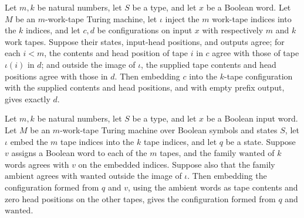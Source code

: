 \begin{lemma}
\label{Turing.MachineFormat.canonEmbedEq}
\leanok
{}
Let $m,k$ be natural numbers, let $S$ be a type, and let $x$ be a Boolean word. Let $M$
be an $m$-work-tape Turing machine, let $\iota$ inject the $m$ work-tape indices into
the $k$ indices, and let $c,d$ be configurations on input $x$ with respectively $m$ and
$k$ work tapes. Suppose their states, input-head positions, and outputs agree; for each
$i<m$, the contents and head position of tape $i$ in $c$ agree with those of tape
$\iota(i)$ in $d$; and outside the image of $\iota$, the supplied tape contents and head
positions agree with those in $d$. Then embedding $c$ into the $k$-tape configuration
with the supplied contents and head positions, and with empty prefix output, gives
exactly $d$.
\end{lemma}

\begin{lemma}
\label{Turing.MachineFormat.canonEmbedWords}
\leanok
{}
Let $m,k$ be natural numbers, let $S$ be a type, and let $x$ be a Boolean input word.
Let $M$ be an $m$-work-tape Turing machine over Boolean symbols and states $S$, let
$\iota$ embed the $m$ tape indices into the $k$ tape indices, and let $q$ be a state.
Suppose $v$ assigns a Boolean word to each of the $m$ tapes, and the family
$\mathrm{wanted}$ of $k$ words agrees with $v$ on the embedded indices. Suppose also
that the family $\mathrm{ambient}$ agrees with $\mathrm{wanted}$ outside the image of
$\iota$. Then embedding the configuration formed from $q$ and $v$, using the ambient
words as tape contents and zero head positions on the other tapes, gives the
configuration formed from $q$ and $\mathrm{wanted}$.
\end{lemma}


